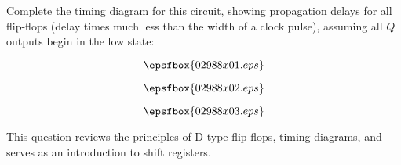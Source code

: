 

Complete the timing diagram for this circuit, showing propagation delays for all flip-flops (delay times much less than the width of a clock pulse), assuming all $Q$ outputs begin in the low state:

$$\epsfbox{02988x01.eps}$$

$$\epsfbox{02988x02.eps}$$







$$\epsfbox{02988x03.eps}$$







This question reviews the principles of D-type flip-flops, timing diagrams, and serves as an introduction to shift registers.




